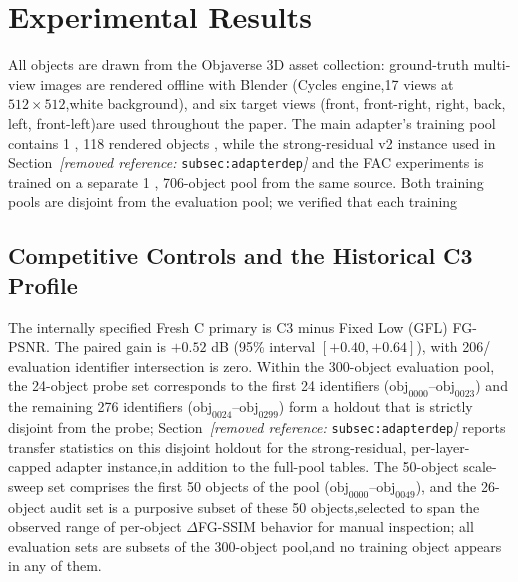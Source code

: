\documentclass[times,twocolumn,final]{elsarticle}
\providecommand{\DIFadd}[1]{{\protect\color{blue} \sf #1}} %
\providecommand{\DIFdel}[1]{{\protect\color{red} \scriptsize #1}} %
\providecommand{\DIFaddbegin}{} %
\providecommand{\DIFaddend}{} %
\providecommand{\DIFdelbegin}{} %
\providecommand{\DIFdelend}{} %
\begin{document}
\DIFdelbegin %
\DIFdelend \DIFaddbegin \section{Experimental Results}
\label{sec:experiments}
\DIFaddend

\DIFdelbegin \DIFdel{All objects are drawn from the Objaverse 3D asset collection: ground-truth multi-view images are rendered offline with Blender (Cycles engine,17 views at $512\times512$,white background), and six target views (front, front-right, right, back, left, front-left)are used throughout the paper. The main adapter's training pool contains 1}%
\DIFdel{,}%
\DIFdel{118 rendered objects , while the strong-residual v2 instance used in Section~\textit{[removed reference: }\texttt{subsec:adapterdep}\textit{]} and the FAC experiments is trained on a separate 1}%
\DIFdel{, }%
\DIFdel{706-object pool from the same source. Both training pools are disjoint from the evaluation pool; we verified that each training}\DIFdelend \DIFaddbegin \subsection{Competitive Controls and the Historical C3 Profile}
\label{subsec:largescale}

\DIFadd{The internally specified Fresh C primary is C3 minus Fixed Low (GFL) FG-PSNR. The paired gain is $+0.52$ dB (95\% interval $[+0.40,+0.64]$), with 206}\DIFaddend /\DIFdelbegin \DIFdel{evaluation identifier intersection is zero. Within the 300-object evaluation pool, the 24-object probe set corresponds to the first 24 identifiers ($\mathrm{obj}_{0000}$--$\mathrm{obj}_{0023}$) and the remaining 276 identifiers ($\mathrm{obj}_{0024}$--$\mathrm{obj}_{0299}$) form a holdout that is strictly disjoint from the probe; Section~\textit{[removed reference: }\texttt{subsec:adapterdep}\textit{]} reports transfer statistics on this disjoint holdout for the strong-residual, per-layer-capped adapter instance,in addition to the full-pool tables.
The 50-object scale-sweep set comprises the first 50 objects of the pool ($\mathrm{obj}_{0000}$--$\mathrm{obj}_{0049}$), and the 26-object audit set is a purposive subset of these 50 objects,selected to span the observed range of per-object $\Delta$FG-SSIM behavior for manual inspection; all evaluation sets are subsets of the 300-object pool,and no training object appears in any of them. }%
\end{document}
